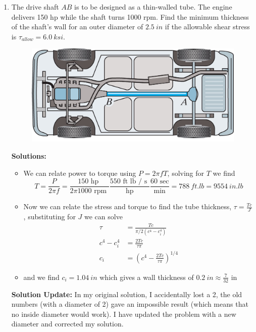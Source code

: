 \documentclass[12pt, oneside]{article}
\let\US\SI
\begin{document}
\begin{enumerate}
	\item %
		The drive shaft $AB$ is to be designed as a thin-walled tube.
		The engine delivers 150 hp while the shaft turns 1000 rpm.
		Find the minimum thickness of the shaft's wall for an outer diameter of $\US{2.5}{in}$ if the allowable shear stress is $\tau_{allow}=\US{6.0}{ksi}$.
		\begin{figure}[H]
			\centering
			\includegraphics[width=0.6\linewidth]{5-28}
		\end{figure}
		\textbf{Solutions:}
		\begin{itemize}
			\item We can relate power to torque using $P = 2\pi f T$, solving for $T$ we find
				\begin{equation*}
					T = \frac{P}{2\pi f} = \frac{ 150 \text{ hp } }{ 2 \pi 1000 \text{ rpm } } \frac{ 550 \text{ ft lb / s } }{ \text { hp } } \frac{ 60 \text{ sec} }{ \text{ min } } = \US{788}{ft.lb} = \US{9554}{in.lb}
				\end{equation*}
			\item Now we can relate the stress and torque to find the tube thickness, $\tau = \frac{Tc}{J}$, substituting for $J$ we can solve
				\begin{align*}
					\tau &= \frac{Tc}{\pi/2 (c^4 - c_i^4)}\\
					c^4 - c_i^4 &= \frac{2 T c}{\tau \pi}\\
					c_i &= \left( c^4 - \frac{2 T c}{\tau \pi} \right)^{1/4}
				\end{align*}
      \item and we find $c_i = \US{1.04}{in}$ which gives a wall thickness of $\US{0.2}{in} \approx \frac{7}{32}\text{ in}$
		\end{itemize}
    \textbf{Solution Update:} In my original solution, I accidentally lost a 2, the old numbers (with a diameter of 2) gave an impossible result (which means that no inside diameter would work).
    I have updated the problem with a new diameter and corrected my solution.


\end{enumerate}
\end{document}
